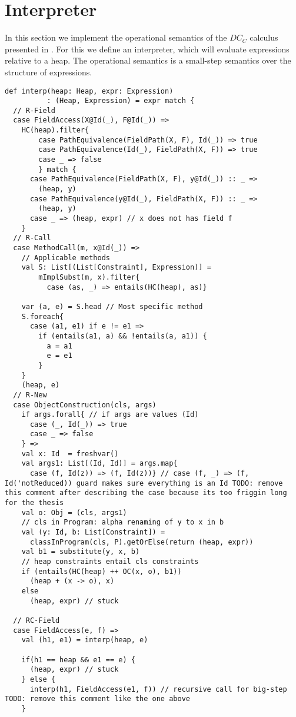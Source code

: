 \section{Interpreter}
In this section we implement
the operational semantics of the $DC_C$ calculus
presented in .
For this we define an interpreter,
which will evaluate expressions relative to a heap.
The operational semantics is a small-step semantics over
the structure of expressions.
%
\begin{lstlisting}[caption={Interpreter},label=lst:interp,captionpos=b,frame={lines}]
def interp(heap: Heap, expr: Expression)
          : (Heap, Expression) = expr match {
  // R-Field
  case FieldAccess(X@Id(_), F@Id(_)) =>
    HC(heap).filter{
        case PathEquivalence(FieldPath(X, F), Id(_)) => true
        case PathEquivalence(Id(_), FieldPath(X, F)) => true
        case _ => false
        } match {
      case PathEquivalence(FieldPath(X, F), y@Id(_)) :: _ =>
        (heap, y)
      case PathEquivalence(y@Id(_), FieldPath(X, F)) :: _ =>
        (heap, y)
      case _ => (heap, expr) // x does not has field f
    }
  // R-Call
  case MethodCall(m, x@Id(_)) =>
    // Applicable methods
    val S: List[(List[Constraint], Expression)] =
        mImplSubst(m, x).filter{
          case (as, _) => entails(HC(heap), as)}

    var (a, e) = S.head // Most specific method
    S.foreach{
      case (a1, e1) if e != e1 =>
        if (entails(a1, a) && !entails(a, a1)) {
          a = a1
          e = e1
        }
    }
    (heap, e)
  // R-New
  case ObjectConstruction(cls, args)
    if args.forall{ // if args are values (Id)
      case (_, Id(_)) => true
      case _ => false
    } =>
    val x: Id  = freshvar()
    val args1: List[(Id, Id)] = args.map{
      case (f, Id(z)) => (f, Id(z))} // case (f, _) => (f, Id('notReduced)) guard makes sure everything is an Id TODO: remove this comment after describing the case because its too friggin long for the thesis
    val o: Obj = (cls, args1)
    // cls in Program: alpha renaming of y to x in b
    val (y: Id, b: List[Constraint]) =
      classInProgram(cls, P).getOrElse(return (heap, expr))
    val b1 = substitute(y, x, b)
    // heap constraints entail cls constraints
    if (entails(HC(heap) ++ OC(x, o), b1))
      (heap + (x -> o), x)
    else
      (heap, expr) // stuck
      
  // RC-Field
  case FieldAccess(e, f) =>
    val (h1, e1) = interp(heap, e)

    if(h1 == heap && e1 == e) {
      (heap, expr) // stuck
    } else {
      interp(h1, FieldAccess(e1, f)) // recursive call for big-step TODO: remove this comment like the one above
    }
    

\end{lstlisting}

